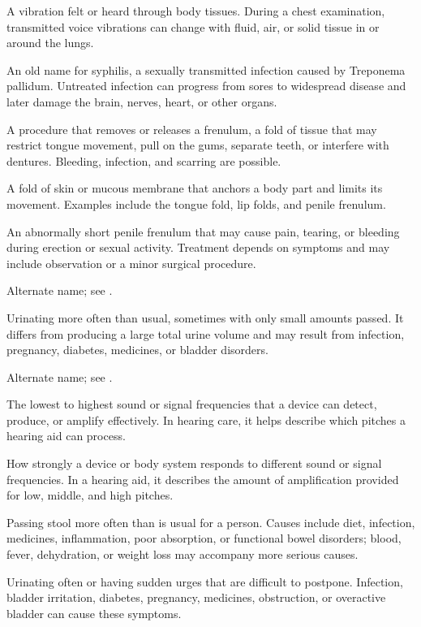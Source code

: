  A vibration felt or heard through body tissues. During a chest examination, transmitted voice vibrations can change with fluid, air, or solid tissue in or around the lungs.

 An old name for syphilis, a sexually transmitted infection caused by Treponema pallidum. Untreated infection can progress from sores to widespread disease and later damage the brain, nerves, heart, or other organs.

 A procedure that removes or releases a frenulum, a fold of tissue that may restrict tongue movement, pull on the gums, separate teeth, or interfere with dentures. Bleeding, infection, and scarring are possible.

 A fold of skin or mucous membrane that anchors a body part and limits its movement. Examples include the tongue fold, lip folds, and penile frenulum.

 An abnormally short penile frenulum that may cause pain, tearing, or bleeding during erection or sexual activity. Treatment depends on symptoms and may include observation or a minor surgical procedure.

 Alternate name; see .

 Urinating more often than usual, sometimes with only small amounts passed. It differs from producing a large total urine volume and may result from infection, pregnancy, diabetes, medicines, or bladder disorders.

 Alternate name; see .

 The lowest to highest sound or signal frequencies that a device can detect, produce, or amplify effectively. In hearing care, it helps describe which pitches a hearing aid can process.

 How strongly a device or body system responds to different sound or signal frequencies. In a hearing aid, it describes the amount of amplification provided for low, middle, and high pitches.

 Passing stool more often than is usual for a person. Causes include diet, infection, medicines, inflammation, poor absorption, or functional bowel disorders; blood, fever, dehydration, or weight loss may accompany more serious causes.

 Urinating often or having sudden urges that are difficult to postpone. Infection, bladder irritation, diabetes, pregnancy, medicines, obstruction, or overactive bladder can cause these symptoms.

